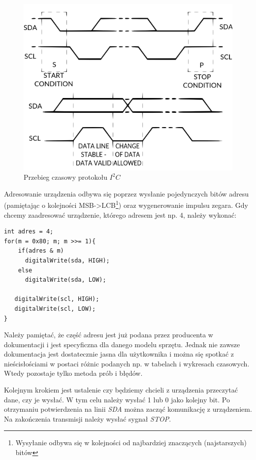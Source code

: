\documentclass{xmgr}
\begin{document}
\begin{figure}[!h]
    \centering
    \includegraphics[height=0.3\textheight]{images/i2c.png}
    \caption{Przebieg czasowy protokołu $I^2C$}
\end{figure}

Adresowanie urządzenia odbywa się poprzez wysłanie pojedynczych bitów adresu (pamiętając o kolejności MSB->LCB\footnote{Wysyłanie odbywa się w kolejności od najbardziej znaczących (najstarszych) bitów}) oraz wygenerowanie impulsu zegara. Gdy chcemy zaadresować urządzenie, którego adresem jest np. 4, należy wykonać:
\begin{lstlisting}[label=bot-dirs-alg,caption=Własna wersja adresowania urządzenia $I^2C$ na przykładzie PCF8574N]
int adres = 4;
for(m = 0x80; m; m >>= 1){
    if(adres & m)         
      digitalWrite(sda, HIGH);
    else
      digitalWrite(sda, LOW);
        
   digitalWrite(scl, HIGH);
   digitalWrite(scl, LOW); 
}
\end{lstlisting}

Należy pamiętać, że część adresu jest już podana przez producenta w dokumentacji i jest specyficzna dla danego modelu sprzętu. Jednak nie zawsze dokumentacja jest dostatecznie jasna dla użytkownika i można się spotkać z nieścisłościami w postaci różnic podanych np. w tabelach i wykresach czasowych. Wtedy pozostaje tylko metoda prób i błędów.

Kolejnym krokiem jest ustalenie czy będziemy chcieli z urządzenia przeczytać dane, czy je wysłać. W tym celu należy wysłać 1 lub 0  jako kolejny bit. Po otrzymaniu potwierdzenia na linii \emph{SDA} można zacząć komunikację z urządzeniem. Na zakończenia transmisji należy wysłać sygnał \emph{STOP}.
\end{document}

